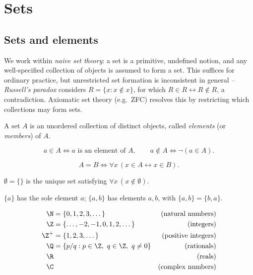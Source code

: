 \section{Sets}
\subsection{Sets and elements}
\label{sec:1-1}

\begin{note}
We work within \emph{naive set theory}: a set is a primitive, undefined notion, and any well-specified collection of objects is assumed to form a set. This suffices for ordinary practice, but unrestricted set formation is inconsistent in general -- \emph{Russell's paradox} considers $R = \{x : x \notin x\}$, for which $R \in R \leftrightarrow R \notin R$, a contradiction. Axiomatic set theory (e.g.\ ZFC) resolves this by restricting which collections may form sets.
\end{note}

\begin{definition}[Set]
A set $A$ is an unordered collection of distinct objects, called \emph{elements} (or \emph{members}) of $A$.
\end{definition}

\begin{definition}[Membership]
\[
a \in A \iff a \text{ is an element of } A, \qquad
a \notin A \iff \neg(a \in A).
\]
\end{definition}

\begin{definition}
\[
A = B \iff \forall x\, (x \in A \leftrightarrow x \in B).
\]
\end{definition}

\begin{definition}
$\emptyset = \{\}$ is the unique set satisfying $\forall x\, (x \notin \emptyset)$.
\end{definition}

\begin{definition}
$\{a\}$ has the sole element $a$; $\{a,b\}$ has elements $a,b$, with $\{a,b\} = \{b,a\}$.
\end{definition}

\begin{definition}
\begin{align*}
\N &= \{0,1,2,3,\dots\} & \text{(natural numbers)}\\
\Z &= \{\dots,-2,-1,0,1,2,\dots\} & \text{(integers)}\\
\Z^+ &= \{1,2,3,\dots\} & \text{(positive integers)}\\
\Q &= \{p/q : p \in \Z,\ q \in \Z,\ q \neq 0\} & \text{(rationals)}\\
\R &&\text{(reals)}\\
\C &&\text{(complex numbers)}
\end{align*}
\end{definition}

